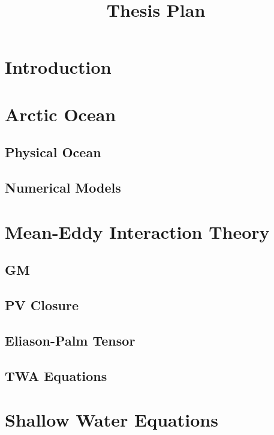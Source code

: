 \documentclass[10pt,a4paper]{article}
\title{Thesis Plan}
\begin{document}
\maketitle


\section{Introduction}

\section{Arctic Ocean}

\subsection{Physical Ocean}

\subsection{Numerical Models}

\section{Mean-Eddy Interaction Theory}

\subsection{GM}

\subsection{PV Closure}

\subsection{Eliason-Palm Tensor}

\subsection{TWA Equations}

\section{Shallow Water Equations}
\end{document}
